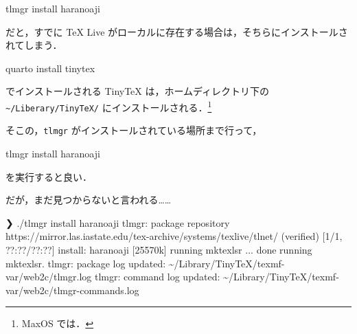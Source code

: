 \documentclass[
]{ltjsarticle}
\newenvironment{Shaded}{\begin{snugshade}}{\end{snugshade}}
\newcommand{\ControlFlowTok}[1]{\textcolor[rgb]{0.00,0.23,0.31}{#1}}
\newcommand{\ExtensionTok}[1]{\textcolor[rgb]{0.00,0.23,0.31}{#1}}
\newcommand{\NormalTok}[1]{\textcolor[rgb]{0.00,0.23,0.31}{#1}}
\newcommand{\OperatorTok}[1]{\textcolor[rgb]{0.37,0.37,0.37}{#1}}
\newcommand{\PreprocessorTok}[1]{\textcolor[rgb]{0.68,0.00,0.00}{#1}}
\newcommand{\StringTok}[1]{\textcolor[rgb]{0.13,0.47,0.30}{#1}}
\begin{document}
\begin{Shaded}
\begin{Highlighting}[]
\ExtensionTok{tlmgr}\NormalTok{ install haranoaji}
\end{Highlighting}
\end{Shaded}

だと，すでに TeX Live
がローカルに存在する場合は，そちらにインストールされてしまう．

\begin{Shaded}
\begin{Highlighting}[]
\ExtensionTok{quarto}\NormalTok{ install tinytex}
\end{Highlighting}
\end{Shaded}

でインストールされる TinyTeX は，ホームディレクトリ下の
\texttt{\textasciitilde{}/Liberary/TinyTeX/}
にインストールされる．\footnote{MaxOS では．}

そこの，\texttt{tlmgr} がインストールされている場所まで行って，

\begin{Shaded}
\begin{Highlighting}[]
\ExtensionTok{tlmgr}\NormalTok{ install haranoaji}
\end{Highlighting}
\end{Shaded}

を実行すると良い．

だが，まだ見つからないと言われる\ldots\ldots{}

\begin{Shaded}
\begin{Highlighting}[]
\ExtensionTok{❯}\NormalTok{ ./tlmgr install haranoaji        }
\ExtensionTok{tlmgr:}\NormalTok{ package repository https://mirror.las.iastate.edu/tex{-}archive/systems/texlive/tlnet/ }\OperatorTok{(verified)}
\ExtensionTok{[1/1,} \PreprocessorTok{??}\NormalTok{:}\PreprocessorTok{??}\NormalTok{/}\PreprocessorTok{??}\NormalTok{:}\PreprocessorTok{??}\NormalTok{] install: haranoaji }\PreprocessorTok{[}\StringTok{25570k}\PreprocessorTok{]}
\ExtensionTok{running}\NormalTok{ mktexlsr ...}
\ControlFlowTok{done} \ExtensionTok{running}\NormalTok{ mktexlsr.}
\ExtensionTok{tlmgr:}\NormalTok{ package log updated: \textasciitilde{}/Library/TinyTeX/texmf{-}var/web2c/tlmgr.log}
\ExtensionTok{tlmgr:}\NormalTok{ command log updated: \textasciitilde{}/Library/TinyTeX/texmf{-}var/web2c/tlmgr{-}commands.log}
\end{Highlighting}
\end{Shaded}
\end{document}
